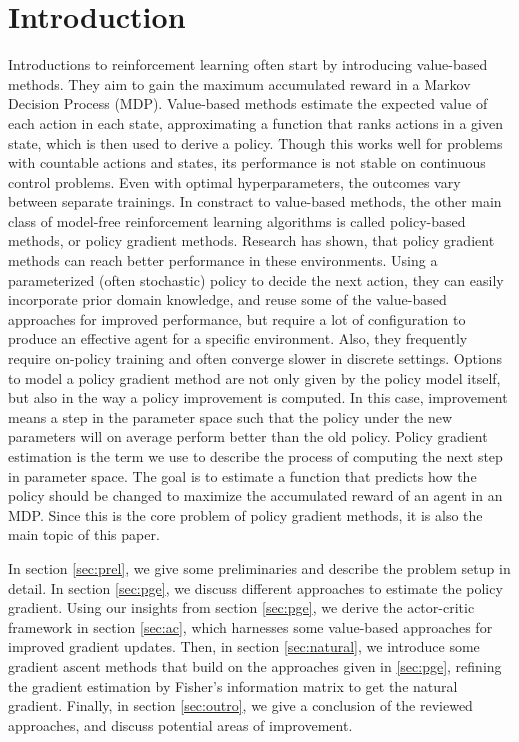 \section{Introduction}
\label{intro}

Introductions to reinforcement learning often start by introducing value-based methods. They aim to gain the maximum accumulated reward in a Markov Decision Process (MDP). Value-based methods estimate the expected value of each action in each state, approximating a function that ranks actions in a given state, which is then used to derive a policy. Though this works well for problems with countable actions and states, its performance is not stable on continuous control problems. Even with optimal hyperparameters, the outcomes vary between separate trainings. \cite{DBLP:journals/corr/MetzIJD17} In constract to value-based methods, the other main class of model-free reinforcement learning algorithms is called policy-based methods, or policy gradient methods. Research has shown, that policy gradient methods can reach better performance in these environments. \cite{pmlr-v37-schulman15} Using a parameterized (often stochastic) policy to decide the next action, they can easily incorporate prior domain knowledge, and reuse some of the value-based approaches for improved performance, but require a lot of configuration to produce an effective agent for a specific environment. Also, they frequently require on-policy training and often converge slower in discrete settings. Options to model a policy gradient method are not only given by the policy model itself, but also in the way a policy improvement is computed. \cite{DBLP:journals/corr/SchulmanMLJA15} In this case, improvement means a step in the parameter space such that the policy under the new parameters will on average perform better than the old policy. Policy gradient estimation is the term we use to describe the process of computing the next step in parameter space. The goal is to estimate a function that predicts how the policy should be changed to maximize the accumulated reward of an agent in an MDP. Since this is the core problem of policy gradient methods, it is also the main topic of this paper.

In section \ref{sec:prel}, we give some preliminaries and describe the problem setup in detail. In section \ref{sec:pge}, we discuss different approaches to estimate the policy gradient. Using our insights from section \ref{sec:pge}, we derive the actor-critic framework in section \ref{sec:ac}, which harnesses some value-based approaches for improved gradient updates. Then, in section \ref{sec:natural}, we introduce some gradient ascent methods that build on the approaches given in \ref{sec:pge}, refining the gradient estimation by Fisher's information matrix to get the natural gradient. Finally, in section \ref{sec:outro}, we give a conclusion of the reviewed approaches, and discuss potential areas of improvement.

